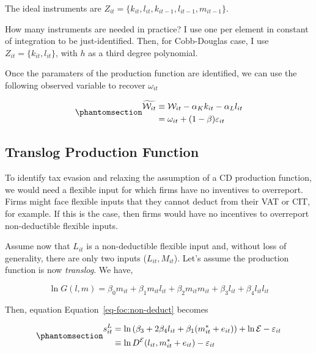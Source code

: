 \documentclass[
  12pt]{article}
\theoremstyle{definition}
\theoremstyle{remark}
\begin{document}
The ideal instruments are
\(Z_{it}=\{k_{it},l_{it},k_{it-1},l_{it-1}, m_{it-1}\}\).

How many instruments are needed in practice? I use one per element in
constant of integration to be just-identified. Then, for Cobb-Douglas
case, I use \(Z_{it}=\{k_{it},l_{it}\}\), with \(h\) as a third degree
polynomial.

Once the paramaters of the production function are identified, we can
use the following observed variable to recover \(\omega_{it}\)

\begin{equation}\phantomsection\label{eq-w-squiggle}{
\begin{aligned}
    \widetilde{\mathcal W_{it}} & \equiv \mathcal W_{it} - \alpha_K k_{it}-\alpha_L l_{it}\\
    & = \omega_{it}+(1-\beta)\varepsilon_{it}
\end{aligned}
}\end{equation}

\subsection{Translog Production
Function}\label{translog-production-function}

To identify tax evasion and relaxing the assumption of a CD production
function, we would need a flexible input for which firms have no
inventives to overreport. Firms might face flexible inputs that they
cannot deduct from their VAT or CIT, for example. If this is the case,
then firms would have no incentives to overreport non-deductible
flexible inputs.

Assume now that \(L_{it}\) is a non-deductible flexible input and,
without loss of generality, there are only two inputs
(\(L_{it}, M_{it}\)). Let's assume the production function is now
\emph{translog}. We have,

\[
 \ln G(l,m)=\beta_0m_{it}+\beta_1m_{it}l_{it}+\beta_2m_{it}m_{it}+\beta_3l_{it}+\beta_4l_{it}l_{it}
\]

Then, equation Equation~\ref{eq-foc:non-deduct} becomes

\begin{equation}\phantomsection\label{eq-translog-share}{
\begin{aligned}
    s_{it}^{L}&=\ln \left(\beta_3+2\beta_4l_{it}+\beta_1(m^*_{it}+e_{it})\right) + \ln \mathcal{E}- \varepsilon_{it} \\
    &\equiv \ln D^{\mathcal{E}}(l_{it},m^*_{it}+e_{it})- \varepsilon_{it} 
\end{aligned}
}\end{equation}
\end{document}
